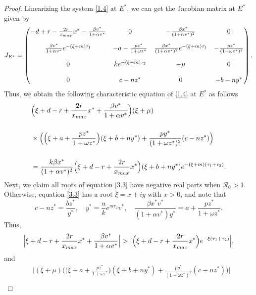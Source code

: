 \documentclass[10pt,a4paper]{amsart}
\numberwithin{equation}{section}
\begin{document}
\begin{proof}
Linearizing the system \eqref{1.4} at $E^*$, we can get the Jacobian matrix at $E^{*}$  
given by	
\[
J_{E^{*}}
=\begin{pmatrix}
-d+r-\frac{2r}{x_{\rm max}}x^*-\frac{\beta v^{*}}{1+\alpha v^{*}}&0&-\frac{\beta x^{*}}{(1+\alpha v^{*})^{2}}&0\\[4mm]
\frac{\beta v^{*}}{1+\alpha v^{*}}e^{-(\xi+m)\tau_1}&-a-\frac{pz^{*}}{1+\omega z^{*}}&\frac{\beta x^{*}}{(1+\alpha v^{*})^{2}}e^{-(\xi+m)\tau_1}
&-\frac{pz^{*}}{(1+\omega z^{*})^{2}}\\[4mm]
 0&ke^{-(\xi+m)\tau_2}&-\mu&0\\[4mm]
 0&c-nz^{*}&0&-b-ny^{*}
 \end{pmatrix}.
\]
Thus, we obtain the following characteristic equation of \eqref{1.4} at $E^{*}$ 
as follows
\begin{equation} \label{3.3}
\begin{aligned}
&\Big(\xi+d-r+{\frac{2r}{x_{\rm max}}x^{*}}+\frac{\beta v^{*}}{1+\alpha v^{*}}\Big)(\xi+\mu)  \\[5mm]
&\times\Big(\Big(\xi+a+{\frac{pz^{*}}{1+\omega z^{*}}}\Big)
(\xi+b+ny^{*})+{\frac{py^{*}}{(1+\omega z^{*})^{2}}}(c-nz^{*})\Big)    \\[5mm]
&=\frac{k\beta x^*}{(1+\alpha v^*)^2}\Big(\xi+d-r+\frac{2r}{x_{\rm max}}x^{*}\Big)(\xi+b+ny^{*})e^{-(\xi+m)(\tau_1+\tau_2)}.
\end{aligned}
\end{equation}
Next, we claim all roots of equation \eqref{3.3} have negative real parts when
$\mathcal{R}_0>1$. Otherwise, equation \eqref{3.3} has a root $\xi=x+iy $ with
$x>0$, and note that
\begin{equation*}
c-nz^{*}=\frac{bz^{*}}{y^{*}}, \quad y^{*}=\frac{u}{k}e^{m\tau_2}v^{*},\quad
\frac{\beta x^{*}v^*}{(1+\alpha v^{*})y^{*} }=a+\frac{pz^{*}}{1+\omega z^{*}}.
\end{equation*}
Thus,
\begin{equation} \label{3.4}
\Big|\xi+d-r+\frac{2r}{x_{\rm max}}x^{*}+\frac{\beta v^{*}}{1+\alpha v^{*}}\Big|
>\Big|\Big(\xi+d-r+\frac{2r}{x_{\rm max}}x^{*}\Big)e^{-\xi(\tau_1+\tau_2)}\Big|,
\end{equation}
and
\begin{equation} \label{3.5}
\begin{aligned}
&\Big|(\xi+\mu)\Big(\Big(\xi+a+{\frac{pz^{*}}{1+\omega z^{*}}}\Big)
 (\xi+b+ny^{*})+{\frac{py^{*}}{(1+\omega z^{*})^{2}}}(c-nz^{*})\Big)\Big|  \\

\end{aligned}
\end{equation}
\end{proof}
\end{document}
